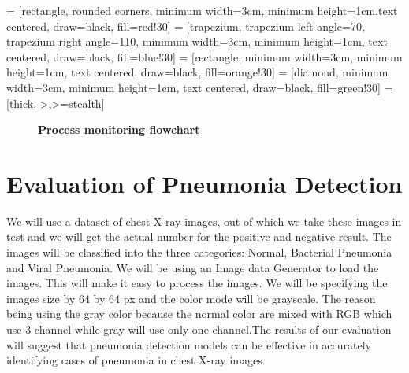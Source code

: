 \usetikzlibrary{shapes.geometric, arrows}

 = [rectangle, rounded corners, minimum width=3cm, minimum height=1cm,text centered, draw=black, fill=red!30]
 = [trapezium, trapezium left angle=70, trapezium right angle=110, minimum width=3cm, minimum height=1cm, text centered, draw=black, fill=blue!30]
 = [rectangle, minimum width=3cm, minimum height=1cm, text centered, draw=black, fill=orange!30]
 = [diamond, minimum width=3cm, minimum height=1cm, text centered, draw=black, fill=green!30]
 = [thick,->,>=stealth]

\begin{figure}[htb]
	\centering
{}
\footnotesize 	\caption{\textbf{Process monitoring flowchart}}
\label{fig:Process monitoring flowchart}
\end{figure}

\section{Evaluation of Pneumonia Detection}

We will use a dataset of chest X-ray images, out of which we take these images in test and we will get the actual number for the positive and negative result. The images will be classified into the three categories: Normal, Bacterial Pneumonia and Viral Pneumonia. We will be using an Image data Generator to load the images. This will make it easy to process the images. We will be specifying the images size by 64 by 64 px and the color mode will be grayscale. The reason being using the gray color because the normal color are mixed with RGB which use 3 channel while gray will use only one channel.The results of our evaluation will suggest that pneumonia detection models can be effective in accurately identifying cases of pneumonia in chest X-ray images.\\ \bigskip

